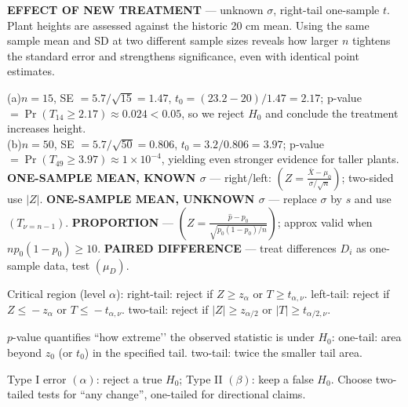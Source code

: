 \documentclass[landscape,0.4pt]{article}
\begin{document}
\begin{multicols*}{6}

\textbf{\tiny{EFFECT OF NEW TREATMENT}} — unknown $\sigma$, right-tail one-sample $t$.  
Plant heights are assessed against the historic 20 cm mean.  Using the same sample mean and SD at two different sample sizes reveals how larger $n$ tightens the standard error and strengthens significance, even with identical point estimates.

(a)\;$n=15$, SE $=5.7/\sqrt{15}=1.47$, $t_0=(23.2-20)/1.47=2.17$; p-value $=\Pr(T_{14}\ge2.17)\approx0.024<0.05$, so we reject $H_{0}$ and conclude the treatment increases height.\\
(b)\;$n=50$, SE $=5.7/\sqrt{50}=0.806$, $t_0=3.2/0.806=3.97$; p-value $=\Pr(T_{49}\ge3.97)\approx1\times10^{-4}$, yielding even stronger evidence for taller plants.\\[-2pt]


\textbf{\tiny{ONE-SAMPLE MEAN, KNOWN $\sigma$}} — right/left: $(Z=\tfrac{\bar{X}-\mu_0}{\sigma/\sqrt{n}})$; two-sided use $|Z|$.  
\textbf{\tiny{ONE-SAMPLE MEAN, UNKNOWN $\sigma$}} — replace $\sigma$ by $s$ and use $(T_{\nu=n-1})$.  
\textbf{\tiny{PROPORTION}} — $(Z=\tfrac{\hat{p}-p_0}{\sqrt{p_0(1-p_0)/n}})$; approx valid when $np_0(1-p_0)\!\ge\!10$.  
\textbf{\tiny{PAIRED DIFFERENCE}} — treat differences $D_i$ as one-sample data, test $(\mu_D)$.  

Critical region (level $\alpha$):  
\; right-tail: reject if $Z\!\ge\!z_\alpha$ or $T\!\ge\!t_{\alpha,\nu}$.  
\; left-tail: reject if $Z\!\le\!-z_\alpha$ or $T\!\le\!-t_{\alpha,\nu}$.  
\; two-tail: reject if $|Z|\!\ge\!z_{\alpha/2}$ or $|T|\!\ge\!t_{\alpha/2,\nu}$.  

$p$-value quantifies “how extreme’’ the observed statistic is under $H_0$:  
\; one-tail: area beyond $z_0$ (or $t_0$) in the specified tail.  
\; two-tail: twice the smaller tail area.  

Type I error $(\alpha)$: reject a true $H_0$; Type II $(\beta)$: keep a false $H_0$.  Choose two-tailed tests for “any change”, one-tailed for directional claims.



\end{multicols*}
\end{document}

